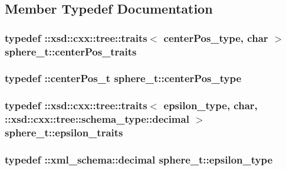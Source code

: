 \subsection{Member Typedef Documentation}
\hypertarget{classsphere__t_a8519b138a55654520cb9314bbb472cfd}{
\subsubsection[{center\-Pos\-\_\-traits}]{\setlength{\rightskip}{0pt plus 5cm}typedef \-::xsd\-::cxx\-::tree\-::traits$<$ {\bf center\-Pos\-\_\-type}, char $>$ {\bf sphere\-\_\-t\-::center\-Pos\-\_\-traits}}}\label{classsphere__t_a8519b138a55654520cb9314bbb472cfd}
\hypertarget{classsphere__t_a2786a8606da5d1dfbb50a237d6834daf}{
\subsubsection[{center\-Pos\-\_\-type}]{\setlength{\rightskip}{0pt plus 5cm}typedef \-::{\bf center\-Pos\-\_\-t} {\bf sphere\-\_\-t\-::center\-Pos\-\_\-type}}}\label{classsphere__t_a2786a8606da5d1dfbb50a237d6834daf}
\hypertarget{classsphere__t_aaec867e294b5dc835b6b7b23bd6f03cb}{
\subsubsection[{epsilon\-\_\-traits}]{\setlength{\rightskip}{0pt plus 5cm}typedef \-::xsd\-::cxx\-::tree\-::traits$<$ {\bf epsilon\-\_\-type}, char, \-::xsd\-::cxx\-::tree\-::schema\-\_\-type\-::decimal $>$ {\bf sphere\-\_\-t\-::epsilon\-\_\-traits}}}\label{classsphere__t_aaec867e294b5dc835b6b7b23bd6f03cb}
\hypertarget{classsphere__t_a9e61f3d5ab269b28a198f4b47519ac3f}{
\subsubsection[{epsilon\-\_\-type}]{\setlength{\rightskip}{0pt plus 5cm}typedef \-::{\bf xml\-\_\-schema\-::decimal} {\bf sphere\-\_\-t\-::epsilon\-\_\-type}}}\label{classsphere__t_a9e61f3d5ab269b28a198f4b47519ac3f}
